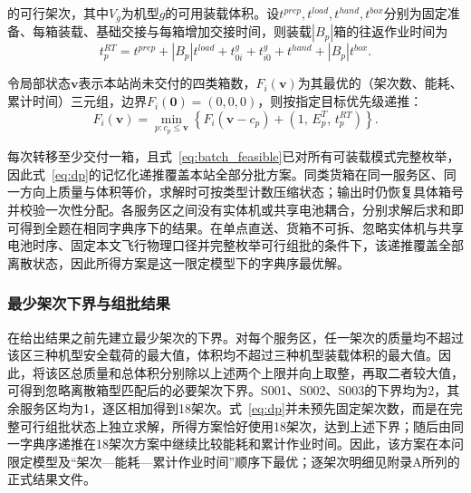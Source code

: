 的可行架次，其中$V_g$为机型$g$的可用装载体积。设$t^{prep},t^{load},t^{hand},t^{box}$分别为固定准备、每箱装载、基础交接与每箱增加交接时间，则装载$|B_p|$箱的往返作业时间为
\begin{equation}
t_p^{RT}=t^{prep}+|B_p|t^{load}+t_{0i}^{g}+t_{i0}^{g}+t^{hand}+|B_p|t^{box}.
\label{eq:batch_time}
\end{equation}

令局部状态$\mathbf{v}$表示本站尚未交付的四类箱数，$F_i(\mathbf{v})$为其最优的（架次数、能耗、累计时间）三元组，边界$F_i(\mathbf{0})=(0,0,0)$，则按指定目标优先级递推：
\begin{equation}
F_i(\mathbf{v})=\min_{p:c_p\leq\mathbf{v}}\left\{F_i(\mathbf{v}-c_p)+\left(1,\,E_p^T,\,t_p^{RT}\right)\right\}.
\label{eq:dp}
\end{equation}

每次转移至少交付一箱，且式~\eqref{eq:batch_feasible}已对所有可装载模式完整枚举，因此式~\eqref{eq:dp}的记忆化递推覆盖本站全部分批方案。同类货箱在同一服务区、同一方向上质量与体积等价，求解时可按类型计数压缩状态；输出时仍恢复具体箱号并校验一次性分配。各服务区之间没有实体机或共享电池耦合，分别求解后求和即可得到全题在相同字典序下的结果。在单点直送、货箱不可拆、忽略实体机与共享电池时序、固定本文飞行物理口径并完整枚举可行组批的条件下，该递推覆盖全部离散状态，因此所得方案是这一限定模型下的字典序最优解。

\subsubsection{最少架次下界与组批结果}

在给出结果之前先建立最少架次的下界。对每个服务区，任一架次的质量均不超过该区三种机型安全载荷的最大值，体积均不超过三种机型装载体积的最大值。因此，将该区总质量和总体积分别除以上述两个上限并向上取整，再取二者较大值，可得到忽略离散箱型匹配后的必要架次下界。S001、S002、S003的下界均为2，其余服务区均为1，逐区相加得到18架次。式~\eqref{eq:dp}并未预先固定架次数，而是在完整可行组批状态上独立求解，所得方案恰好使用18架次，达到上述下界；随后由同一字典序递推在18架次方案中继续比较能耗和累计作业时间。因此，该方案在本问限定模型及“架次—能耗—累计作业时间”顺序下最优；逐架次明细见附录A所列的正式结果文件。

